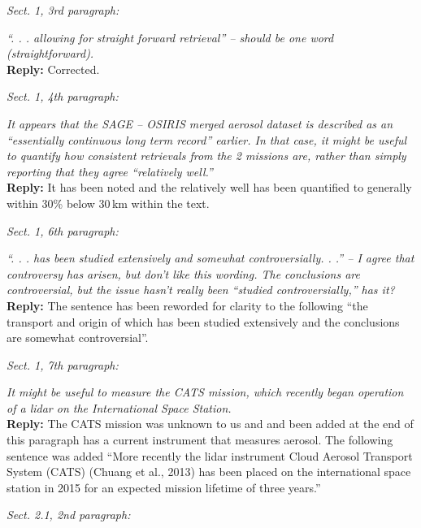 \documentclass[12pt, notitlepage]{article}
\begin{document}
\hrulefill

\textit{Sect. 1, 3rd paragraph:}

\textit{``. . . allowing for straight forward retrieval'' – should be one word (straightforward).}\\

\textbf{Reply:} Corrected.

\hrulefill

\textit{Sect. 1, 4th paragraph:}

\textit{It appears that the SAGE – OSIRIS merged aerosol dataset is described as an ``essentially
continuous long term record'' earlier. In that case, it might be useful to quantify
how consistent retrievals from the 2 missions are, rather than simply reporting that they
agree ``relatively well.''}\\

\textbf{Reply:} It has been noted and the relatively well has been quantified to generally within 30\% below 30\,km within the text.

\hrulefill

\textit{Sect. 1, 6th paragraph:}

\textit{``. . . has been studied extensively and somewhat controversially. . .'' – I agree that controversy
has arisen, but don't like this wording. The conclusions are controversial, but
the issue hasn't really been ``studied controversially,'' has it?}\\

\textbf{Reply:} The sentence has been reworded for clarity to the following ``the transport and origin of which has been
studied extensively and the conclusions are somewhat controversial''.

\hrulefill

\textit{Sect. 1, 7th paragraph:}

\textit{It might be useful to measure the CATS mission, which recently began operation of a
lidar on the International Space Station.}\\

\textbf{Reply:} The CATS mission was unknown to us and and been added at the end of this paragraph has a current instrument that measures aerosol. The following sentence was added ``More recently the lidar instrument Cloud Aerosol Transport System (CATS) (Chuang et al., 2013) has been placed on the international space station in 2015 for an expected mission lifetime of three years.''

\hrulefill

\textit{Sect. 2.1, 2nd paragraph:}
\end{document}
